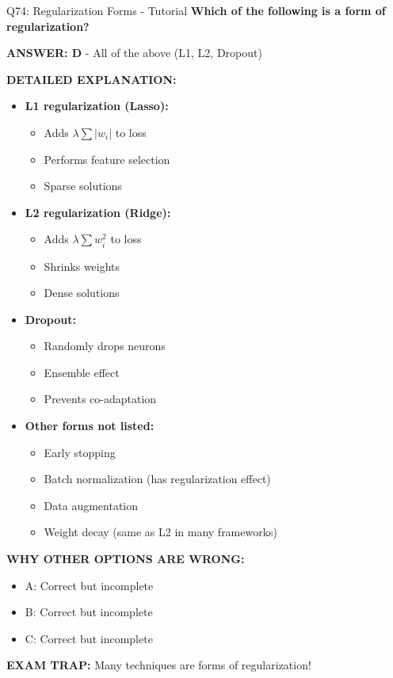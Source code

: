 \documentclass[8pt]{beamer}
\begin{document}
	\begin{frame}{Q74: Regularization Forms - Tutorial}
		\fontsize{6.5}{7.5}\selectfont
		\textbf{Which of the following is a form of regularization?}
		
		\vspace{0.05cm}
		\textcolor{myblue}{\textbf{ANSWER: D}} - All of the above (L1, L2, Dropout)
		
		\vspace{0.05cm}
		\textbf{DETAILED EXPLANATION:}
		\begin{itemize}
			\item \textbf{L1 regularization (Lasso):}
			\begin{itemize}
				\item Adds $\lambda \sum |w_i|$ to loss
				\item Performs feature selection
				\item Sparse solutions
			\end{itemize}
			\item \textbf{L2 regularization (Ridge):}
			\begin{itemize}
				\item Adds $\lambda \sum w_i^2$ to loss
				\item Shrinks weights
				\item Dense solutions
			\end{itemize}
			\item \textbf{Dropout:}
			\begin{itemize}
				\item Randomly drops neurons
				\item Ensemble effect
				\item Prevents co-adaptation
			\end{itemize}
			\item \textbf{Other forms not listed:}
			\begin{itemize}
				\item Early stopping
				\item Batch normalization (has regularization effect)
				\item Data augmentation
				\item Weight decay (same as L2 in many frameworks)
			\end{itemize}
		\end{itemize}
		
		\vspace{0.05cm}
		\textcolor{myred}{\textbf{WHY OTHER OPTIONS ARE WRONG:}}
		\begin{itemize}
			\item \textcolor{myred}{A:} Correct but incomplete
			\item \textcolor{myred}{B:} Correct but incomplete
			\item \textcolor{myred}{C:} Correct but incomplete
		\end{itemize}
		
		\textcolor{myred}{\textbf{EXAM TRAP:}} Many techniques are forms of regularization!
	\end{frame}
	
\end{document}
